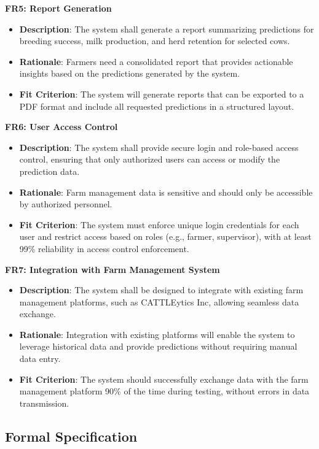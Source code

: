 \documentclass[12pt]{article}
\begin{document}
\textbf{FR5: Report Generation}
\begin{itemize}
    \item \textbf{Description}: The system shall generate a report summarizing 
    predictions for breeding success, milk production, and herd retention for selected cows.
    \item \textbf{Rationale}: Farmers need a consolidated report that provides 
    actionable insights based on the predictions generated by the system.
    \item \textbf{Fit Criterion}: The system will generate reports that can be 
    exported to a PDF format and include all requested predictions in a structured layout.
\end{itemize}
\textbf{FR6: User Access Control}
\begin{itemize}
    \item \textbf{Description}: The system shall provide secure login and 
    role-based access control, ensuring that only authorized users can access 
    or modify the prediction data.
    \item \textbf{Rationale}: Farm management data is sensitive and should only 
    be accessible by authorized personnel.
    \item \textbf{Fit Criterion}: The system must enforce unique login credentials 
    for each user and restrict access based on roles (e.g., farmer, supervisor), 
    with at least 99\% reliability in access control enforcement.
\end{itemize}
\textbf{FR7: Integration with Farm Management System}
\begin{itemize}
    \item \textbf{Description}: The system shall be designed to integrate with 
    existing farm management platforms, such as CATTLEytics Inc, allowing seamless 
    data exchange.
    \item \textbf{Rationale}: Integration with existing platforms will enable 
    the system to leverage historical data and provide predictions without 
    requiring manual data entry.
    \item \textbf{Fit Criterion}: The system should successfully exchange data 
    with the farm management platform 90\% of the time during testing, 
    without errors in data transmission.
\end{itemize}

\subsection{Formal Specification}
\end{document}
